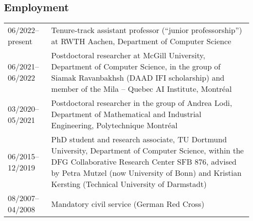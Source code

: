 \documentclass[11pt, a4paper, DIV=12]{scrartcl}
\begin{document}
\subsection*{Employment}
\begin{tabular}{p{3.0cm}p{11.5cm}}
    06/2022--present& Tenure-track assistant professor (``junior professorship'') at RWTH Aachen, Department of Computer Science\\
	06/2021--06/2022& Postdoctoral researcher at McGill University, Department of Computer Science, in the group of Siamak Ravanbakhsh (DAAD IFI scholarship) and member of the Mila -- Quebec AI Institute, Montréal\\
	03/2020--05/2021& Postdoctoral researcher in the group of Andrea Lodi, Department of Mathematical and Industrial Engineering, Polytechnique Montréal\\
	06/2015--12/2019&PhD student and research associate, TU Dortmund University, Department of Computer Science, within the DFG Collaborative Research Center SFB 876, advised by Petra Mutzel (now University of Bonn) and Kristian Kersting (Technical University of Darmstadt)\\
	08/2007--04/2008&Mandatory civil service (German Red Cross)\\
\end{tabular}

\renewcommand{\refname}{\large\bfseries Publications}
\end{document}

